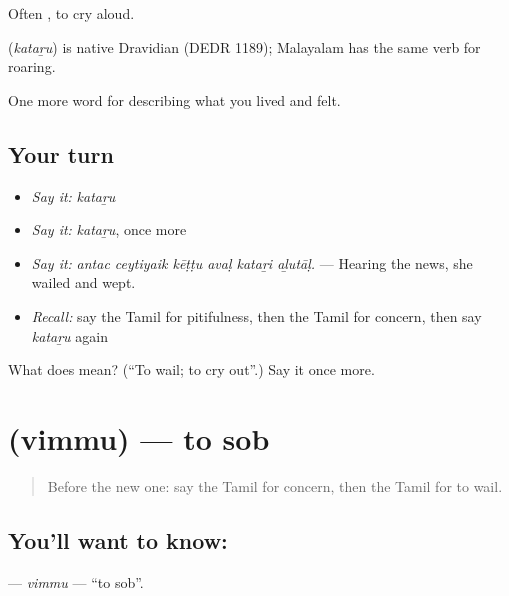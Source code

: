Often  , to cry aloud.

\begin{cousinweb}
\textbf{} (\emph{kataṟu}) is native Dravidian (DEDR 1189); Malayalam has the same verb for roaring.
\end{cousinweb}

\begin{grammarlens}[title={What you've built}]
One more word for describing what you lived and felt.
\end{grammarlens}

\subsection*{Your turn}
\begin{itemize}
\raggedright
  \item \emph{Say it:} \emph{kataṟu}
  \item \emph{Say it:} \emph{kataṟu}, once more
  \item \emph{Say it:} \emph{antac ceytiyaik kēṭṭu avaḷ kataṟi aḻutāḷ.} — Hearing the news, she wailed and wept.
  \item \emph{Recall:} say the Tamil for pitifulness, then the Tamil for concern, then say \emph{kataṟu} again
\end{itemize}

\begin{tcolorbox}[breakable,colback=teal!4,colframe=teal!35!black,title={Before you move on}]
What does  mean? (\textquotedblleft{}To wail; to cry out\textquotedblright{}.) Say it once more.
\end{tcolorbox}
\section[\texorpdfstring{\ta{விம்மு} (vimmu)}{விம்மு (vimmu)}]{ (vimmu) — to sob}

\label{lesson:TA-C458-vimmu}



\begin{quote}
Before the new one: say the Tamil for concern, then the Tamil for to wail.
\end{quote}

\subsection*{You'll want to know: }
\textbf{} — \emph{vimmu} — \textquotedblleft{}to sob\textquotedblright{}.

